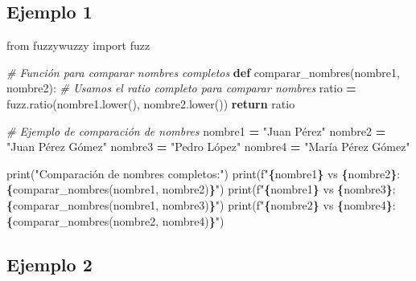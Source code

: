 \documentclass[
  a4paper,
  DIV=11,
  numbers=noendperiod]{scrreprt}
\newenvironment{Shaded}{\begin{snugshade}}{\end{snugshade}}
\newcommand{\BuiltInTok}[1]{#1}
\newcommand{\CommentTok}[1]{\textcolor[rgb]{0.56,0.35,0.01}{\textit{#1}}}
\newcommand{\ControlFlowTok}[1]{\textcolor[rgb]{0.13,0.29,0.53}{\textbf{#1}}}
\newcommand{\ImportTok}[1]{#1}
\newcommand{\KeywordTok}[1]{\textcolor[rgb]{0.13,0.29,0.53}{\textbf{#1}}}
\newcommand{\NormalTok}[1]{#1}
\newcommand{\OperatorTok}[1]{\textcolor[rgb]{0.81,0.36,0.00}{\textbf{#1}}}
\newcommand{\SpecialCharTok}[1]{\textcolor[rgb]{0.81,0.36,0.00}{\textbf{#1}}}
\newcommand{\SpecialStringTok}[1]{\textcolor[rgb]{0.31,0.60,0.02}{#1}}
\newcommand{\StringTok}[1]{\textcolor[rgb]{0.31,0.60,0.02}{#1}}
\begin{document}
\subsection{Ejemplo 1}\label{ejemplo-1}

\begin{Shaded}
\begin{Highlighting}[numbers=left,,]
\ImportTok{from}\NormalTok{ fuzzywuzzy }\ImportTok{import}\NormalTok{ fuzz}

\CommentTok{\# Función para comparar nombres completos}
\KeywordTok{def}\NormalTok{ comparar\_nombres(nombre1, nombre2):}
    \CommentTok{\# Usamos el ratio completo para comparar nombres}
\NormalTok{    ratio }\OperatorTok{=}\NormalTok{ fuzz.ratio(nombre1.lower(), nombre2.lower())}
    \ControlFlowTok{return}\NormalTok{ ratio}

\CommentTok{\# Ejemplo de comparación de nombres}
\NormalTok{nombre1 }\OperatorTok{=} \StringTok{"Juan Pérez"}
\NormalTok{nombre2 }\OperatorTok{=} \StringTok{"Juan Pérez Gómez"}
\NormalTok{nombre3 }\OperatorTok{=} \StringTok{"Pedro López"}
\NormalTok{nombre4 }\OperatorTok{=} \StringTok{"María Pérez Gómez"}

\BuiltInTok{print}\NormalTok{(}\StringTok{"Comparación de nombres completos:"}\NormalTok{)}
\BuiltInTok{print}\NormalTok{(}\SpecialStringTok{f"}\SpecialCharTok{\{}\NormalTok{nombre1}\SpecialCharTok{\}}\SpecialStringTok{ vs }\SpecialCharTok{\{}\NormalTok{nombre2}\SpecialCharTok{\}}\SpecialStringTok{: }\SpecialCharTok{\{}\NormalTok{comparar\_nombres(nombre1, nombre2)}\SpecialCharTok{\}}\SpecialStringTok{"}\NormalTok{)}
\BuiltInTok{print}\NormalTok{(}\SpecialStringTok{f"}\SpecialCharTok{\{}\NormalTok{nombre1}\SpecialCharTok{\}}\SpecialStringTok{ vs }\SpecialCharTok{\{}\NormalTok{nombre3}\SpecialCharTok{\}}\SpecialStringTok{: }\SpecialCharTok{\{}\NormalTok{comparar\_nombres(nombre1, nombre3)}\SpecialCharTok{\}}\SpecialStringTok{"}\NormalTok{)}
\BuiltInTok{print}\NormalTok{(}\SpecialStringTok{f"}\SpecialCharTok{\{}\NormalTok{nombre2}\SpecialCharTok{\}}\SpecialStringTok{ vs }\SpecialCharTok{\{}\NormalTok{nombre4}\SpecialCharTok{\}}\SpecialStringTok{: }\SpecialCharTok{\{}\NormalTok{comparar\_nombres(nombre2, nombre4)}\SpecialCharTok{\}}\SpecialStringTok{"}\NormalTok{)}
\end{Highlighting}
\end{Shaded}

\subsection{Ejemplo 2}\label{ejemplo-2}
\end{document}
